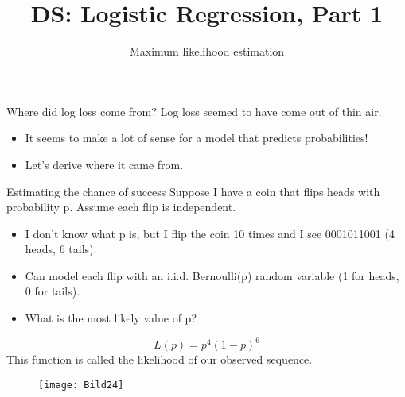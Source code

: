 \documentclass[aspectratio=169]{../latex_main/tntbeamer}  %
\title[Introduction]{DS: Logistic Regression, Part 1}
\subtitle{Maximum likelihood estimation}
\begin{document}
	
	\maketitle
	\begin{frame}{Where did log loss come from?}
	    Log loss seemed to have come out of thin air.
	    \begin{itemize}
	        \item It seems to make a lot of sense for a model that predicts probabilities!
	        \item Let’s derive where it came from.
	    \end{itemize}
	\end{frame}
	
	
	
	\begin{frame}{Estimating the chance of success}
	    Suppose I have a coin that flips heads with probability p. Assume each flip is independent.
	    \begin{itemize}
	        \item I don’t know what p is, but I flip the coin 10 times and I see 0001011001 (4 heads, 6 tails).
	        \item Can model each flip with an i.i.d. Bernoulli(p) random variable (1 for heads, 0 for tails).
	        \item What is the most likely value of p?
	    \end{itemize}
	    \begin{equation*}
	        L(p) = p^4(1-p)^6
	    \end{equation*}
	    This function is called the likelihood of our observed sequence.
	    \begin{figure}
	        \centering
	        \texttt{[image: Bild24]}
	    \end{figure}
	\end{frame}
	
\end{document}
